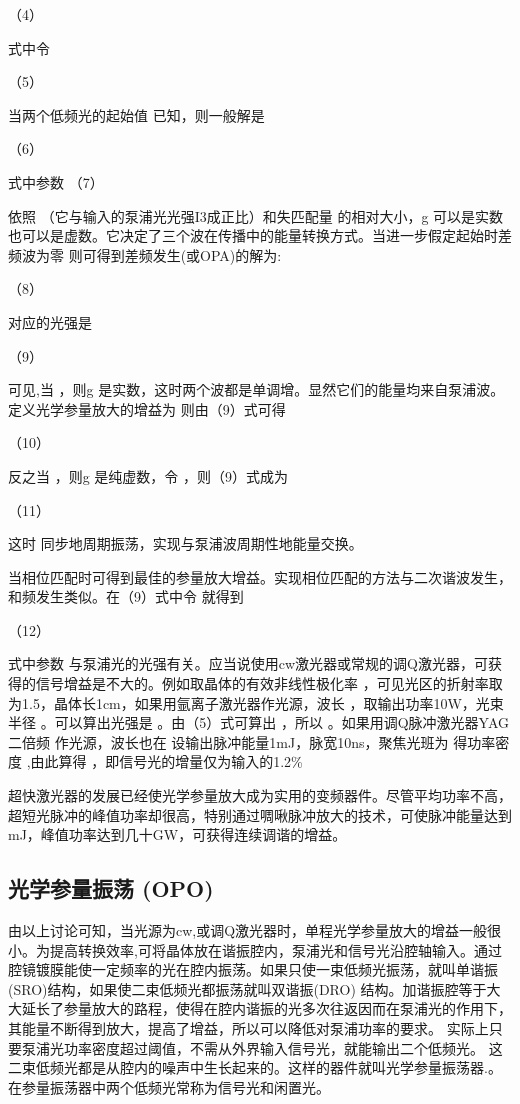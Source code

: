                                                       （4）

式中令

                             （5）

当两个低频光的起始值 已知，则一般解是

      （6）

式中参数                                             （7）

依照 （它与输入的泵浦光光强I3成正比）和失匹配量 的相对大小，g 可以是实数也可以是虚数。它决定了三个波在传播中的能量转换方式。当进一步假定起始时差频波为零 则可得到差频发生(或OPA)的解为: 

                                  （8）

对应的光强是

                         （9）

可见,当 ，则g 是实数，这时两个波都是单调增。显然它们的能量均来自泵浦波。定义光学参量放大的增益为 则由（9）式可得

                 （10）                      
                    
反之当 ，则g 是纯虚数，令 ，则（9）式成为

                                    （11）

这时 同步地周期振荡，实现与泵浦波周期性地能量交换。

当相位匹配时可得到最佳的参量放大增益。实现相位匹配的方法与二次谐波发生，和频发生类似。在（9）式中令 就得到

                                 （12）                

式中参数 与泵浦光的光强有关。应当说使用cw激光器或常规的调Q激光器，可获得的信号增益是不大的。例如取晶体的有效非线性极化率 ，可见光区的折射率取为1.5，晶体长1cm，如果用氩离子激光器作光源，波长 ，取输出功率10W，光束半径 。可以算出光强是 。由（5）式可算出 ，所以 。如果用调Q脉冲激光器YAG 二倍频 作光源，波长也在  设输出脉冲能量1mJ，脉宽10ns，聚焦光班为 得功率密度 ,由此算得 ，即信号光的增量仅为输入的1.2\%

超快激光器的发展已经使光学参量放大成为实用的变频器件。尽管平均功率不高，超短光脉冲的峰值功率却很高，特别通过啁啾脉冲放大的技术，可使脉冲能量达到mJ，峰值功率达到几十GW，可获得连续调谐的增益。

\subsection{光学参量振荡  (OPO)}
由以上讨论可知，当光源为cw,或调Q激光器时，单程光学参量放大的增益一般很小。为提高转换效率,可将晶体放在谐振腔内，泵浦光和信号光沿腔轴输入。通过腔镜镀膜能使一定频率的光在腔内振荡。如果只使一束低频光振荡，就叫单谐振(SRO)结构，如果使二束低频光都振荡就叫双谐振(DRO) 结构。加谐振腔等于大大延长了参量放大的路程，使得在腔内谐振的光多次往返因而在泵浦光的作用下，其能量不断得到放大，提高了增益，所以可以降低对泵浦功率的要求。  实际上只要泵浦光功率密度超过阈值，不需从外界输入信号光，就能输出二个低频光。 这二束低频光都是从腔内的噪声中生长起来的。这样的器件就叫光学参量振荡器.。在参量振荡器中两个低频光常称为信号光和闲置光。

